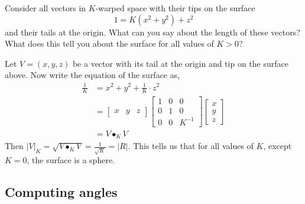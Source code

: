 \documentclass[newpage,hints,handout,12pt,noauthor,nooutcomes]{ximera}
\begin{document}
\begin{problem}
  Consider all vectors in $K$-warped space with their tips on the surface
  \[
  1=K(x^2+y^2)+z^2
  \]
  and their tails at the origin. What can you say about the length of these
  vectors? What does this tell you about the surface for all values of $K>0$?
  
\begin{freeResponse}
Let $V = \left(x,y,z\right)$ be a vector with its tail at the origin and tip on the surface above. Now write the equation of the surface as,
\begin{align*}
\frac{1}{K} &= x^{2} + y^{2} + \frac{1}{K} \cdot z^{2} \\
&= \begin{bmatrix}
	x & y & z
	\end{bmatrix}
\begin{bmatrix}
	1 & 0 & 0 \\
	0 & 1 & 0 \\
	0 & 0 & K^{-1}
	\end{bmatrix}
\begin{bmatrix}
	x \\
	y \\
	z
	\end{bmatrix}\\
&= V \bullet_{K} V
\end{align*}
Then $|V|_{K} = \sqrt{V \bullet_{K} V} = \frac{1}{\sqrt{K}} = |R|$. This tells us that for all values of $K$, except $K=0$, the surface is a sphere. 
\end{freeResponse}

\end{problem}



\subsection{Computing angles}
\end{document}
